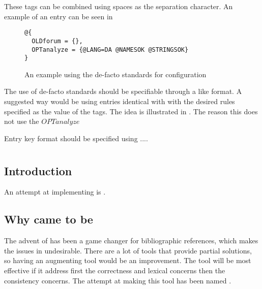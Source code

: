These tags can be combined using spaces as the separation character.
An example of an entry can be seen in \figref

\begin{figure}
  \centering
\begin{verbatim}
@{
  OLDforum = {},
  OPTanalyze = {@LANG=DA @NAMESOK @STRINGSOK}
}
\end{verbatim}
  \caption{An example using the de-facto standards for configuration}
  \label{fig:analyzing_added_de_facto_standards}
\end{figure}


The use of de-facto standards should be specifiable through a
{\bibtex} like format.  A suggested way would be using entries
identical with {\bibtex} with the desired rules specified as the value
of the tags.  The idea is illustrated in
.  The reason this does not use
the $OPTanalyze$

Entry key format should be specified using ....


\section{{\orangutan}}

\subsection{Introduction}

An attempt at implementing is {\orangutan}.


\subsection{Why {\orangutan} came to be}


The advent of {\bibtex} has been a game changer for bibliographic
references, which makes the issues in {\bibtex} undesirable.  There
are a lot of tools that provide partial solutions, so having an
augmenting tool would be an improvement.  The tool will be most
effective if it address first the correctness and lexical concerns
then the consistency concerns.  The attempt at making this tool has
been named \newdef{\orangutan}.


